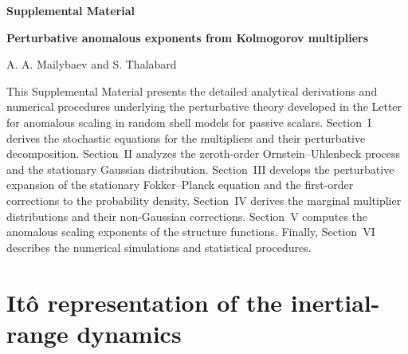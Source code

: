 \documentclass[aps,twocolumn,superscriptaddress]{revtex4-2}
\begin{document}
\begin{center}
{\Large \textbf{Supplemental Material}}

\vspace{0.3cm}

{\large \bf Perturbative anomalous exponents from Kolmogorov multipliers}

\vspace{0.2cm}

A. A. Mailybaev and S. Thalabard
\end{center}

\vspace{0.5cm}


This Supplemental Material presents the detailed analytical derivations and numerical procedures underlying the perturbative theory developed in the Letter for anomalous scaling in random shell models for passive scalars.
Section~I derives the stochastic equations for the multipliers and their perturbative decomposition. Section~II analyzes the zeroth-order Ornstein--Uhlenbeck process and the stationary Gaussian distribution. Section~III develops the perturbative expansion of the stationary Fokker--Planck equation and the first-order corrections to the probability density. Section~IV derives the marginal multiplier distributions and their non-Gaussian corrections. Section~V computes the anomalous scaling exponents of the structure functions. Finally, Section~VI describes the numerical simulations and statistical procedures.

\section{It\^o representation of the inertial-range dynamics}
\end{document}
